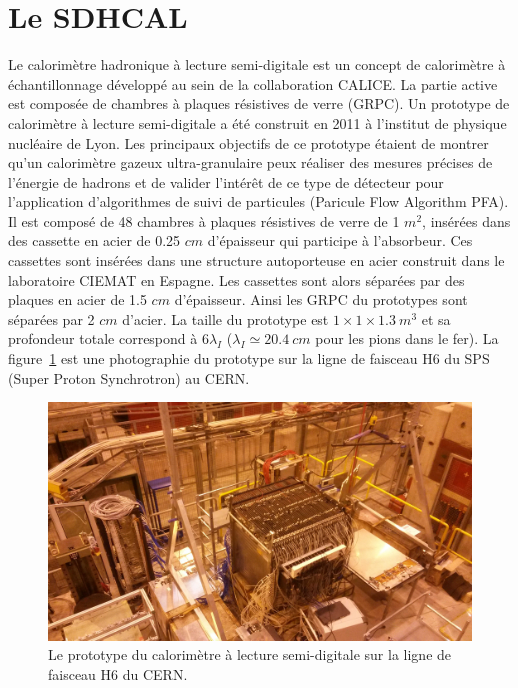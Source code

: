 \section{Le SDHCAL}
Le calorimètre hadronique à lecture semi-digitale est un concept de calorimètre à échantillonnage développé au sein de la collaboration CALICE. La partie active est composée de chambres à plaques résistives de verre (GRPC). Un prototype de calorimètre à lecture semi-digitale a été construit en 2011 à l’institut de physique nucléaire de Lyon. Les principaux objectifs de ce prototype étaient de montrer qu'un calorimètre gazeux ultra-granulaire peux réaliser des mesures précises de l'énergie de hadrons et de valider l'intérêt de ce type de détecteur pour l'application d'algorithmes de suivi de particules (Paricule Flow Algorithm PFA). Il est composé de 48 chambres à plaques résistives de verre  de 1 $m^2$, insérées dans des cassette en acier de 0.25 $cm$ d'épaisseur qui participe à l'absorbeur. Ces cassettes sont insérées dans une structure autoporteuse en acier construit dans le laboratoire CIEMAT en Espagne. Les cassettes sont alors séparées par des plaques en acier de 1.5 $cm$ d'épaisseur. Ainsi les GRPC du prototypes sont séparées par 2 $cm$ d'acier. La taille du prototype est $1\times1\times1.3~m^3$ et sa profondeur totale correspond à 6$\lambda_I$ ($\lambda_I\simeq20.4~cm$ pour les pions dans le fer). La figure~\ref{fig:proto} est une photographie du prototype sur la ligne de faisceau H6 du SPS (Super Proton Synchrotron) au CERN.
\begin{figure}[!h]
  \begin{center}
    \includegraphics[width=.8\textwidth]{SDHCAL/figs/proto.jpg}
    \caption{Le prototype du calorimètre à lecture semi-digitale sur la ligne de faisceau H6 du CERN.}
    \label{fig:proto}
  \end{center}
\end{figure}
%
